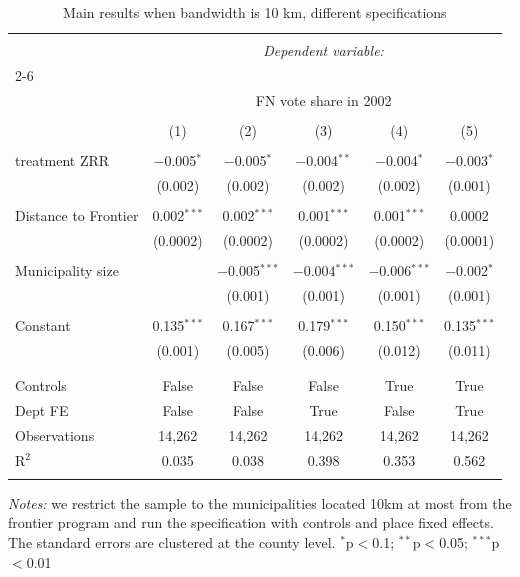 \begin{appendices}
\iffalse
\begin{table}[!htbp]
\centering
\small
\caption{Main results when bandwidth is 10 km, different specifications} 
\label{tab:rdd_results_outcomes_10-1995}
\begin{tabular}{@{\extracolsep{3pt}}lccccc} 
\\[-1.8ex]\hline 
\hline \\[-1.8ex] 
 & \multicolumn{5}{c}{\textit{Dependent variable:}} \\ 
\cline{2-6} 
\\[-1.8ex] & \multicolumn{5}{c}{FN vote share in 2002} \\ 
\\[-1.8ex] & (1) & (2) & (3) & (4) & (5)\\ 
\hline \\[-1.8ex] 
 treatment ZRR & $-$0.005$^{*}$ & $-$0.005$^{*}$ & $-$0.004$^{**}$ & $-$0.004$^{*}$ & $-$0.003$^{*}$ \\ 
  & (0.002) & (0.002) & (0.002) & (0.002) & (0.001) \\ 
  & & & & & \\ 
 Distance to Frontier & 0.002$^{***}$ & 0.002$^{***}$ & 0.001$^{***}$ & 0.001$^{***}$ & 0.0002 \\ 
  & (0.0002) & (0.0002) & (0.0002) & (0.0002) & (0.0001) \\ 
  & & & & & \\ 
 Municipality size &  & $-$0.005$^{***}$ & $-$0.004$^{***}$ & $-$0.006$^{***}$ & $-$0.002$^{*}$ \\ 
  &  & (0.001) & (0.001) & (0.001) & (0.001) \\ 
  & & & & & \\ 
 Constant & 0.135$^{***}$ & 0.167$^{***}$ & 0.179$^{***}$ & 0.150$^{***}$ & 0.135$^{***}$ \\ 
  & (0.001) & (0.005) & (0.006) & (0.012) & (0.011) \\ 
  & & & & & \\ 
\hline \\[-1.8ex] 
Controls & False & False & False & True & True \\ 
Dept FE & False & False & True & False & True \\ 
Observations & 14,262 & 14,262 & 14,262 & 14,262 & 14,262 \\ 
R$^{2}$ & 0.035 & 0.038 & 0.398 & 0.353 & 0.562 \\ 
\hline 
\hline \\[-1.8ex] 
\end{tabular} 
\parbox{\textwidth}{\footnotesize \textit{Notes:} we restrict the sample to the municipalities located 10km at most from the frontier program and run the specification with controls and place fixed effects. The standard errors are clustered at the county level. $^{*}$p$<$0.1; $^{**}$p$<$0.05; $^{***}$p$<$0.01}
\end{table}


\end{appendices}
